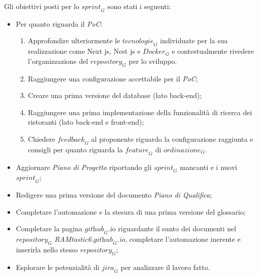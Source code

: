 Gli obiettivi posti per lo $\textit{sprint}_G$ sono stati i seguenti:
\begin{itemize}
    \item Per quanto riguarda il \emph{PoC}:
    \begin{enumerate}
        \item Approfondire ulteriormente le $\textit{tecnologie}_G$ individuate per la sua realizzazione come Next js, Nest js e $\textit{Docker}_G$ e contestualmente rivedere l'organizzazione del $\textit{repository}_G$ per lo sviluppo.
        \item Raggiungere una configurazione accettabile per il \emph{PoC};
        \item Creare una prima versione del database (lato back-end);
        \item Raggiungere una prima implementazione della funzionalità di ricerca dei ristoranti (lato back-end e front-end);
        \item Chiedere $\textit{feedback}_G$ al proponente riguardo la configurazione raggiunta e consigli per quanto riguarda la $\textit{feature}_G$ di $\textit{ordinazione}_G$.
    \end{enumerate}
    \item Aggiornare \emph{Piano di Progetto} riportando gli $\textit{sprint}_G$ mancanti e i nuovi $\textit{sprint}_G$;
    \item Redigere una prima versione del documento \emph{Piano di Qualifica};
    \item Completare l'automazione e la stesura di una prima versione del glossario;
    \item Completare la pagina $\textit{github}_G$.io riguardante il sunto dei documenti nel $\textit{repository}_G$ \emph{RAMtastic6.$\textit{github}_G$.io}, completare l'automazione inerente e inserirla nello stesso $\textit{repository}_G$;
    \item Esplorare le potenzialità di $\textit{jira}_G$ per analizzare il lavoro fatto.
\end{itemize}

